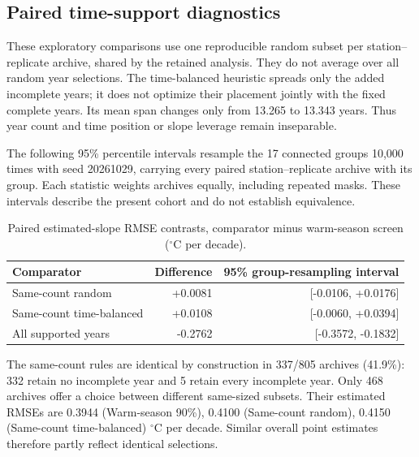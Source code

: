 \subsection{Paired time-support diagnostics}

These exploratory comparisons use one reproducible random subset per station--replicate archive, shared by the retained analysis. They do not average over all random year selections. The time-balanced heuristic spreads only the added incomplete years; it does not optimize their placement jointly with the fixed complete years. Its mean span changes only from 13.265 to 13.343 years. Thus year count and time position or slope leverage remain inseparable.

The following 95\% percentile intervals resample the 17 connected groups 10,000 times with seed 20261029, carrying every paired station--replicate archive with its group. Each statistic weights archives equally, including repeated masks. These intervals describe the present cohort and do not establish equivalence.

\begin{table}[t]\centering\small\caption{Paired estimated-slope RMSE contrasts, comparator minus warm-season screen ($^{\circ}$C per decade).}\label{tab:time-paired-revision}

\begin{tabular}{lrr}\toprule Comparator & Difference & 95\% group-resampling interval \\\midrule

Same-count random & +0.0081 & [-0.0106, +0.0176] \\

Same-count time-balanced & +0.0108 & [-0.0060, +0.0394] \\

All supported years & -0.2762 & [-0.3572, -0.1832] \\

\bottomrule\end{tabular}\end{table}

The same-count rules are identical by construction in 337/805 archives (41.9\%): 332 retain no incomplete year and 5 retain every incomplete year. Only 468 archives offer a choice between different same-sized subsets. Their estimated RMSEs are 0.3944 (Warm-season 90\%), 0.4100 (Same-count random), 0.4150 (Same-count time-balanced) $^{\circ}$C per decade. Similar overall point estimates therefore partly reflect identical selections.

